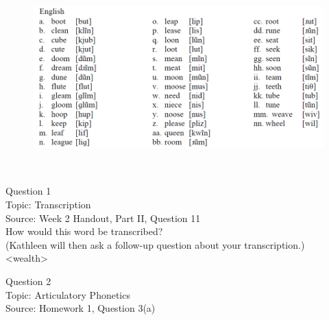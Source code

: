 \documentclass[12pt]{article}
\begin{document}
\begin{figure}[H]
\includegraphics{../images/english12.png}
\end{figure}

\newpage

\begin{center}
\textbf{{\color{red}{\HUGE END OF EXAM}}}\\

\end{center}
\newpage

\begin{center}
\textbf{{\color{blue}{\HUGE START OF EXAM\\}}}

\textbf{{\color{blue}{\HUGE Student ID: 83324\\}}}

\textbf{{\color{blue}{\HUGE \\}}}

\end{center}
\newpage

{\large Question 1}\\

Topic: Transcription\\
Source: Week 2 Handout, Part II, Question 11\\

How would this word be transcribed?\\ (Kathleen will then ask a follow-up question about your transcription.)\\

<wealth>


\newpage

{\large Question 2}\\

Topic: Articulatory Phonetics\\
Source: Homework 1, Question 3(a)\\
\end{document}
